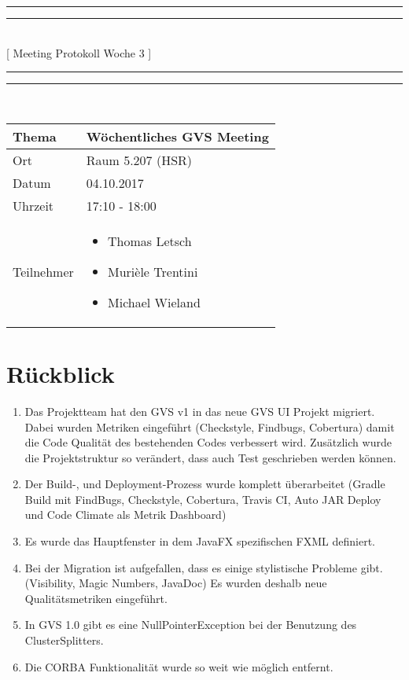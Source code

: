 \documentclass[11pt, a4paper,oneside]{scrartcl}
\begin{document}
\centering
\rule{\textwidth}{1.6pt}\vspace*{-\baselineskip}\vspace*{2pt} %
\rule{\textwidth}{0.4pt}\\[\baselineskip] %
{\LARGE [ Meeting Protokoll Woche 3 ]}\\[0.2\baselineskip] %
\rule{\textwidth}{0.4pt}\vspace*{-\baselineskip}\vspace{3.2pt} %
\rule{\textwidth}{1.6pt}\\[2\baselineskip] %

\begin{tabu} to \linewidth {l X }
	\toprule
	\textbf{Thema} & \textbf{Wöchentliches GVS Meeting} \\
	\midrule
	Ort & Raum 5.207 (HSR) \\
	Datum & 04.10.2017 \\
	Uhrzeit & 17:10 - 18:00 \\
	Teilnehmer & 
	\begin{minipage}[t]{\textwidth}
	  	\begin{itemize}
	  		\item Thomas Letsch
			\item Murièle Trentini
			\item Michael Wieland
	  	\end{itemize}
	\end{minipage}
	\\
	\bottomrule
\end{tabu}


\section{Rückblick}
\begin{enumerate}
	\item Das Projektteam hat den GVS v1 in das neue GVS UI Projekt migriert. Dabei wurden Metriken eingeführt (Checkstyle, Findbugs, Cobertura) damit die Code Qualität des bestehenden Codes verbessert wird. Zusätzlich wurde die Projektstruktur so verändert, dass auch Test geschrieben werden können.
	\item Der Build-, und Deployment-Prozess wurde komplett überarbeitet (Gradle Build mit FindBugs, Checkstyle, Cobertura, Travis CI, Auto JAR Deploy und Code Climate als Metrik Dashboard)
	\item Es wurde das Hauptfenster in dem JavaFX spezifischen FXML definiert.
	\item Bei der Migration ist aufgefallen, dass es einige stylistische Probleme gibt. (Visibility, Magic Numbers, JavaDoc) Es wurden deshalb neue Qualitätsmetriken eingeführt.
	\item In GVS 1.0 gibt es eine NullPointerException bei der Benutzung des ClusterSplitters.
	\item Die CORBA Funktionalität wurde so weit wie möglich entfernt. 
\end{enumerate}
\end{document}
